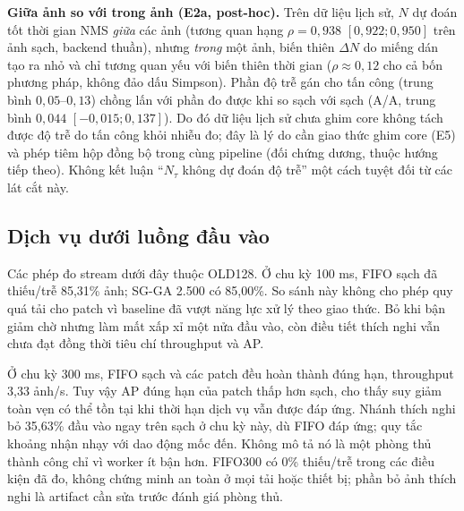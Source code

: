 \documentclass[a4paper,fleqn]{cas-dc}
\begin{document}
\textbf{Giữa ảnh so với trong ảnh (E2a, post-hoc).} Trên dữ liệu lịch sử, $N$ dự đoán tốt thời gian NMS \emph{giữa} các ảnh (tương quan hạng $\rho=0{,}938$ $[0{,}922;0{,}950]$ trên ảnh sạch, backend thuần), nhưng \emph{trong} một ảnh, biến thiên $\Delta N$ do miếng dán tạo ra nhỏ và chỉ tương quan yếu với biến thiên thời gian ($\rho\approx0{,}12$ cho cả bốn phương pháp, không đảo dấu Simpson). Phần độ trễ gán cho tấn công (trung bình $0{,}05$--$0{,}13$) chồng lấn với phần đo được khi so sạch với sạch (A/A, trung bình $0{,}044$ $[-0{,}015;0{,}137]$). Do đó dữ liệu lịch sử chưa ghim core không tách được độ trễ do tấn công khỏi nhiễu đo; đây là lý do cần giao thức ghim core (E5) và phép tiêm hộp đồng bộ trong cùng pipeline (đối chứng dương, thuộc hướng tiếp theo). Không kết luận ``$N_\tau$ không dự đoán độ trễ'' một cách tuyệt đối từ các lát cắt này.

\subsection{Dịch vụ dưới luồng đầu vào}

Các phép đo stream dưới đây thuộc OLD128. Ở chu kỳ 100 ms, FIFO sạch đã thiếu/trễ 85,31\% ảnh; SG-GA 2.500 có 85,00\%. So sánh này không cho phép quy quá tải cho patch vì baseline đã vượt năng lực xử lý theo giao thức. Bỏ khi bận giảm chờ nhưng làm mất xấp xỉ một nửa đầu vào, còn điều tiết thích nghi vẫn chưa đạt đồng thời tiêu chí throughput và AP.

Ở chu kỳ 300 ms, FIFO sạch và các patch đều hoàn thành đúng hạn, throughput 3,33 ảnh/s. Tuy vậy AP đúng hạn của patch thấp hơn sạch, cho thấy suy giảm toàn vẹn có thể tồn tại khi thời hạn dịch vụ vẫn được đáp ứng. Nhánh thích nghi bỏ 35,63\% đầu vào ngay trên sạch ở chu kỳ này, dù FIFO đáp ứng; quy tắc khoảng nhận nhạy với dao động mốc đến. Không mô tả nó là một phòng thủ thành công chỉ vì worker ít bận hơn. FIFO300 có 0\% thiếu/trễ trong các điều kiện đã đo, không chứng minh an toàn ở mọi tải hoặc thiết bị; phần bỏ ảnh thích nghi là artifact cần sửa trước đánh giá phòng thủ.
\end{document}
